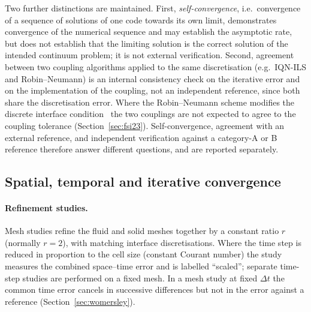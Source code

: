 Two further distinctions are maintained.
First, \emph{self-convergence}, i.e.\ convergence of a sequence of solutions of one code towards its own limit, demonstrates convergence of the numerical sequence and may establish the asymptotic rate, but does not establish that the limiting solution is the correct solution of the intended continuum problem; it is not external verification.
Second, agreement between two coupling algorithms applied to the same discretisation (e.g.\ IQN-ILS and Robin--Neumann) is an internal consistency check on the iterative error and on the implementation of the coupling, not an independent reference, since both share the discretisation error.
Where the Robin--Neumann scheme modifies the discrete interface condition~\citep{Tukovic2018b} the two couplings are not expected to agree to the coupling tolerance (Section~\ref{sec:fsi23}).
Self-convergence, agreement with an external reference, and independent verification against a category-A or B reference therefore answer different questions, and are reported separately.

\subsection{Spatial, temporal and iterative convergence}\label{sec:convergence_method}

\paragraph{Refinement studies.}
Mesh studies refine the fluid and solid meshes together by a constant ratio $r$ (normally $r=2$), with matching interface discretisations.
Where the time step is reduced in proportion to the cell size (constant Courant number) the study measures the combined space--time error and is labelled ``scaled''; separate time-step studies are performed on a fixed mesh.
In a mesh study at fixed $\Delta t$ the common time error cancels in successive differences but not in the error against a reference (Section~\ref{sec:womersley}).


